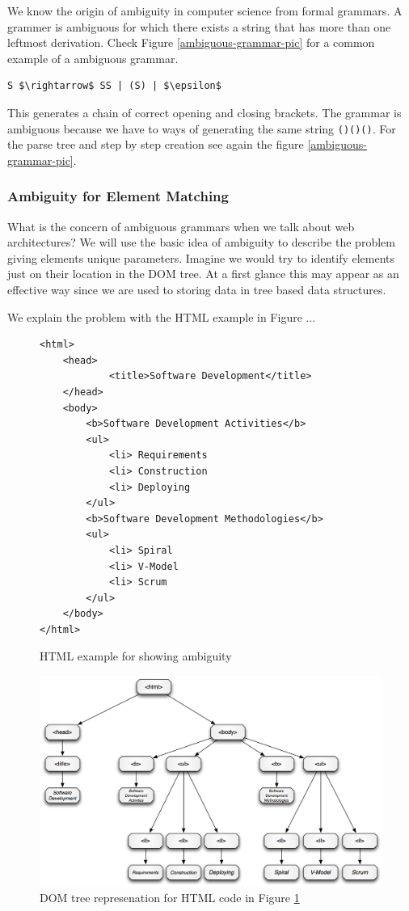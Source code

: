 We know the origin of ambiguity in computer science from formal grammars. A grammer is ambiguous for which there exists a string that has more than one leftmost derivation. Check Figure \ref{ambiguous-grammar-pic} for a common example of a ambiguous grammar.
\begin{lstlisting}[mathescape]
S $\rightarrow$ SS | (S) | $\epsilon$
\end{lstlisting}
This generates a chain of correct opening and closing brackets. The grammar is ambiguous because we have to ways of generating the same string \verb^()()()^. For the parse tree and step by step creation see again the figure \ref{ambiguous-grammar-pic}.

\subsubsection{Ambiguity for Element Matching}

What is the concern of ambiguous grammars when we talk about web architectures? We will use the basic idea of ambiguity to describe the problem giving elements unique parameters. Imagine we would try to identify elements just on their location in the DOM tree. At a first glance this may appear as an effective way since we are used to storing data in tree based data structures. 

We explain the problem with the HTML example in Figure ...
\begin{figure}
\begin{lstlisting}
<html>
	<head>
			<title>Software Development</title>
	</head>
	<body>
		<b>Software Development Activities</b>
		<ul>		
			<li> Requirements 
			<li> Construction 
			<li> Deploying		
		</ul>
		<b>Software Development Methodologies</b>
		<ul>		
			<li> Spiral
			<li> V-Model 
			<li> Scrum		
		</ul>
	</body>
</html>
\end{lstlisting}
\label{dom-html-example}
\caption{HTML example for showing ambiguity}
\end{figure}


\begin{figure}[h!] \centering
		\includegraphics[width=13cm]{images/dom-tree-example.png}
		\caption{DOM tree represenation for HTML code in Figure \ref{dom-html-example}}
		\label{dom-tree-example}
\end{figure} 

